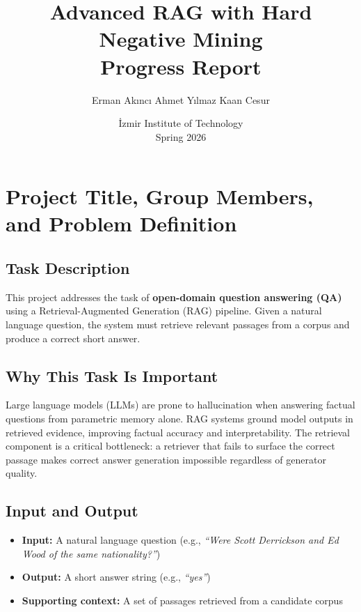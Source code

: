 \documentclass[12pt,a4paper]{article}
\title{
    \textbf{Advanced RAG with Hard Negative Mining} \\[0.5em]
    \Large Progress Report
}
\author{
    Erman Akıncı \quad
    Ahmet Yılmaz \quad
    Kaan Cesur
}
\date{
    İzmir Institute of Technology \\
    Spring 2026
}
\begin{document}
\maketitle
\tableofcontents
\newpage

\section{Project Title, Group Members, and Problem Definition}

\subsection*{Task Description}

This project addresses the task of \textbf{open-domain question answering (QA)} using a
Retrieval-Augmented Generation (RAG) pipeline. Given a natural language question, the
system must retrieve relevant passages from a corpus and produce a correct short answer.

\subsection*{Why This Task Is Important}

Large language models (LLMs) are prone to hallucination when answering factual questions
from parametric memory alone. RAG systems ground model outputs in retrieved evidence,
improving factual accuracy and interpretability. The retrieval component is a critical
bottleneck: a retriever that fails to surface the correct passage makes correct answer
generation impossible regardless of generator quality.

\subsection*{Input and Output}

\begin{itemize}[noitemsep]
    \item \textbf{Input:} A natural language question
          (e.g., \textit{``Were Scott Derrickson and Ed Wood of the same nationality?''})
    \item \textbf{Output:} A short answer string (e.g., \textit{``yes''})
    \item \textbf{Supporting context:} A set of passages retrieved from a candidate corpus
\end{itemize}
\end{document}
